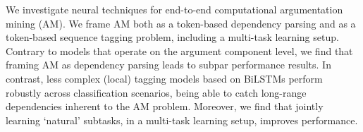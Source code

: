 We investigate neural techniques for end-to-end computational argumentation mining (AM). We frame AM both as a token-based dependency parsing and as a token-based sequence tagging problem, including a multi-task learning setup. Contrary to models that operate on the argument component level, we find that framing AM as dependency parsing leads to subpar performance results. In contrast, less complex (local) tagging models based on BiLSTMs perform robustly across classification scenarios, being able to catch long-range dependencies inherent to the AM problem. Moreover, we find that jointly learning `natural' subtasks, in a multi-task learning setup, improves performance.
